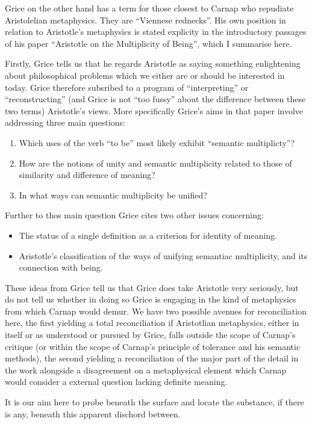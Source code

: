 \documentclass[10pt,titlepage]{book}
\begin{document}
Grice on the other hand has a term for those closest to Carnap who repudiate Aristolelian metaphysics.
They are ``Viennese rednecks''.
His own position in relation to Aristotle's metaphysics is stated explicity in the introductory passages of his paper ``Aristotle on the Multiplicity of Being'', which I summarise here.

Firstly, Grice tells us that he regards Aristotle as saying something enlightening about philosophical problems which we either are or should be interested in today.
Grice therefore subsribed to a program of ``interpreting'' or ``reconstructing'' (and Grice is not ``too fussy'' about the difference between these two terms) Aristotle's views.
More specifically Grice's aims in that paper involve addressing three main questions:
\begin{enumerate}
\item Which uses of the verb ``to be'' most likely exhibit ``semantic multiplicty''?
\item How are the notions of unity and semantic multiplicity related to those of similarity and difference of meaning?
\item In what ways can semantic multiplicity be unified?
\end{enumerate}
Further to thos main question Grice cites two other issues concerning:
\begin{itemize}
\item The status of a single definition as a criterion for identity of meaning.
\item Aristotle's classification of the ways of unifying semantiac multiplicity, and its connection with being.
\end{itemize}

These ideas from Grice tell us that Grice does take Aristotle very seriously, but do not tell us whether in doing so Grice is engaging in the kind of metaphysics from which Carnap would demur.
We have two possible avenues for reconciliation here, the first yielding a total reconciliation if Aristotlian metaphysics, either in itself or as understood or pursued by Grice, falls outside the scope of Carnap's critique (or within the scope of Carnap's principle of tolerance and his semantic methods), the second yielding a reconciliation of the major part of the detail in the work alongside a disagreement on a metaphysical element which Carnap would consider a external question lacking definite meaning.

It is our aim here to probe beneath the surface and locate the substance, if there is any, beneath this apparent dischord between.
\end{document}

